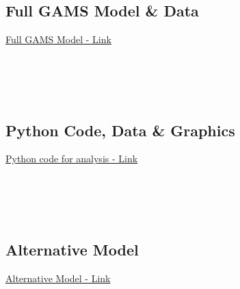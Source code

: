 \subsection{Full GAMS Model \& Data}
\label{app:fullModel}
\href{https://zenodo.org/records/15250066?token=eyJhbGciOiJIUzUxMiJ9.eyJpZCI6ImQ0YTVlZDAzLWU0NDktNDkyYS1iZGNlLTZjMTc3YWNmM2Y3ZCIsImRhdGEiOnt9LCJyYW5kb20iOiJhMDhlZTcwOTU3MjFiZmExMGY0YmUzMjUwZGM2ZjY5ZCJ9.RLOwEcGXlgFzX0IFm-1bEa9GjshtvCu_SmehFOBJg8yQ11NlqWq_4L8OuvG4eeULVS_BRhnSywxuA7vsCfTH9w}{Full GAMS Model - Link}\\

\texttt{}\\
\texttt{}\\
\texttt{}\\
\texttt{}\\
\texttt{}

\subsection{Python Code, Data \& Graphics}
\label{app:python}
\href{https://zenodo.org/records/15250072?token=eyJhbGciOiJIUzUxMiJ9.eyJpZCI6ImNmZDY2ZTRmLThiZjctNDI2Yy1hMjkzLWI5NDZkYmVkMTllNSIsImRhdGEiOnt9LCJyYW5kb20iOiJhNjI4MWVmYmJiMGViZTYzOTU0ZDVjMTRmNDU4MWJiMCJ9.uA9bX6OLFf9Pp2ubAHRNnt2GhgJh5wo5rXNeOsO-d_enloZMZBcsV4rCj-NJIkZboyPzi6s5PkMfnyhZUCjNkQ}{Python code for analysis - Link}\\

\texttt{}\\
\texttt{}\\
\texttt{}\\
\texttt{}\\
\texttt{}

\subsection{Alternative Model}
\label{app:altModel}
\href{https://zenodo.org/records/15250055?token=eyJhbGciOiJIUzUxMiJ9.eyJpZCI6IjE1YWFjM2QxLWJmOTItNDliOS1iNDY4LWZmODkyNjY1OWRiNiIsImRhdGEiOnt9LCJyYW5kb20iOiI3ZGI5YjEyODgyNzgxYzdhNGE5Zjc1NWIwOWVhN2YxNSJ9.FBCfOpGd3SIIQKDdfnO6MmOsvnNoW9iQm4AwVD-54T6XpgzppI0E8JzMH1Oq6b0KZh-11kKp2PpRsM_fNMbOnQ}{Alternative Model - Link}\\

